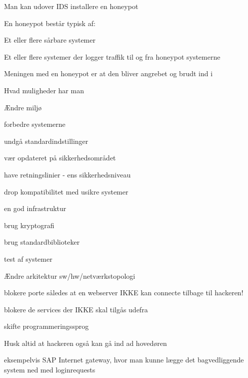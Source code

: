 
\begin{list1}
\item Man kan udover IDS installere en honeypot
\item En honeypot består typisk af:
  \begin{list2}
    \item Et eller flere sårbare systemer
\item Et eller flere systemer der logger traffik til og fra honeypot
  systemerne 
  \end{list2}
\item Meningen med en honeypot er at den bliver angrebet og brudt ind
  i 
\end{list1}





\begin{list1}
\item Hvad muligheder har man
  \begin{list2}
  \item Ændre miljø
  \item forbedre systemerne
  \item undgå standardindstillinger
  \item vær opdateret på sikkerhedsområdet
  \item have retningslinier - ens sikkerhedsniveau
  \item drop kompatibilitet med usikre systemer
  \item en god infrastruktur
  \item brug kryptografi
  \item brug standardbiblioteker
  \item test af systemer
  \end{list2}
\end{list1}


\begin{list1}
\item Ændre arkitektur sw/hw/netværkstopologi
  \begin{list2}
  \item blokere porte således at en webserver IKKE kan connecte tilbage til hackeren!
  \item blokere de services der IKKE skal tilgås udefra
  \item skifte programmeringssprog
  \end{list2}
\item Husk altid at hackeren også kan gå ind ad hovedøren
\item eksempelvis SAP Internet gateway, hvor man kunne lægge det
  bagvedliggende system ned med loginrequests
\end{list1}

